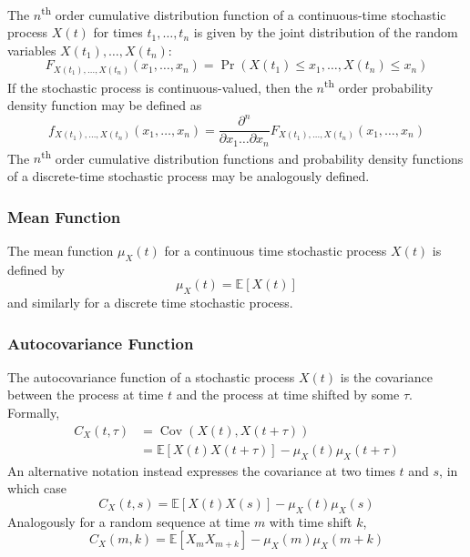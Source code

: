 \documentclass[11pt]{report} %
\begin{document}
The $n$\textsuperscript{th} order cumulative distribution function of a continuous-time stochastic process $X\left(t\right)$ for times $t_{1}, \dots, t_{n}$ is given by the joint distribution of the random variables $X\left(t_{1}\right), \dots, X\left(t_{n}\right)$:
\begin{equation}
F_{X\left(t_{1}\right), \dots, X\left(t_{n}\right)}\left(x_{1}, \dots, x_{n}\right) = \operatorname{Pr}\left(X\left(t_{1}\right) \leq x_{1}, \dots, X\left(t_{n}\right) \leq x_{n}\right)
\end{equation}
If the stochastic process is continuous-valued, then the $n$\textsuperscript{th} order probability density function may be defined as
\begin{equation}
f_{X\left(t_{1}\right), \dots, X\left(t_{n}\right)}\left(x_{1}, \dots, x_{n}\right) = \dfrac{\partial^{n}}{\partial x_{1} \dots \partial x_{n}}F_{X\left(t_{1}\right), \dots, X\left(t_{n}\right)}\left(x_{1}, \dots, x_{n}\right) 
\end{equation}
The $n$\textsuperscript{th} order cumulative distribution functions and probability density functions of a discrete-time stochastic process may be analogously defined.

\subsubsection{Mean Function}

The mean function $\mu_{X}\left(t\right)$ for a continuous time stochastic process $X\left(t\right)$ is defined by
\begin{equation}
\mu_{X}\left(t\right) = \mathbb{E}\left[X\left(t\right)\right]
\end{equation}
and similarly for a discrete time stochastic process.

\subsubsection{Autocovariance Function}

The autocovariance function of a stochastic process $X\left(t\right)$ is the covariance between the process at time $t$ and the process at time shifted by some $\tau$. Formally,
\begin{align}
C_{X}\left(t, \tau\right) &= \operatorname{Cov}\left(X\left(t\right), X\left(t + \tau\right)\right) \\
&= \mathbb{E}\left[X\left(t\right)X\left(t+\tau\right)\right] - \mu_{X}\left(t\right)\mu_{X}\left(t + \tau\right)
\end{align}
An alternative notation instead expresses the covariance at two times $t$ and $s$, in which case
\begin{equation}
C_{X}\left(t, s\right) = \mathbb{E}\left[X\left(t\right)X\left(s\right)\right] - \mu_{X}\left(t\right)\mu_{X}\left(s\right)
\end{equation}
Analogously for a random sequence at time $m$ with time shift $k$,
\begin{equation}
C_{X}\left(m, k\right) = \mathbb{E}\left[X_{m}X_{m + k}\right] - \mu_{X}\left(m\right)\mu_{X}\left(m + k\right)
\end{equation}
\end{document}
